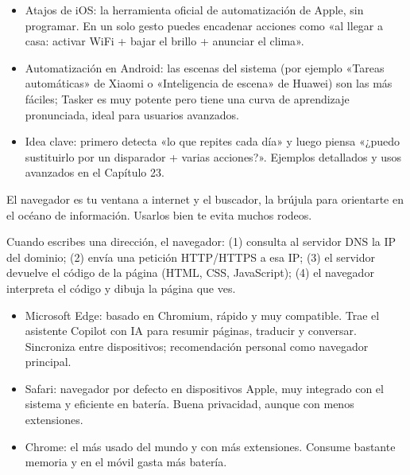\begin{itemize}
  \item Atajos de iOS: la herramienta oficial de automatización de Apple, sin programar. En un solo gesto puedes encadenar acciones como «al llegar a casa: activar WiFi + bajar el brillo + anunciar el clima».
  \item Automatización en Android: las escenas del sistema (por ejemplo «Tareas automáticas» de Xiaomi o «Inteligencia de escena» de Huawei) son las más fáciles; Tasker es muy potente pero tiene una curva de aprendizaje pronunciada, ideal para usuarios avanzados.
  \item Idea clave: primero detecta «lo que repites cada día» y luego piensa «¿puedo sustituirlo por un disparador + varias acciones?». Ejemplos detallados y usos avanzados en el Capítulo 23.
\end{itemize}


El navegador es tu ventana a internet y el buscador, la brújula para orientarte en el océano de información. Usarlos bien te evita muchos rodeos.


Cuando escribes una dirección, el navegador: (1) consulta al servidor DNS la IP del dominio; (2) envía una petición HTTP/HTTPS a esa IP; (3) el servidor devuelve el código de la página (HTML, CSS, JavaScript); (4) el navegador interpreta el código y dibuja la página que ves.


\begin{itemize}
  \item Microsoft Edge: basado en Chromium, rápido y muy compatible. Trae el asistente Copilot con IA para resumir páginas, traducir y conversar. Sincroniza entre dispositivos; recomendación personal como navegador principal.
  \item Safari: navegador por defecto en dispositivos Apple, muy integrado con el sistema y eficiente en batería. Buena privacidad, aunque con menos extensiones.
  \item Chrome: el más usado del mundo y con más extensiones. Consume bastante memoria y en el móvil gasta más batería.
\end{itemize}


